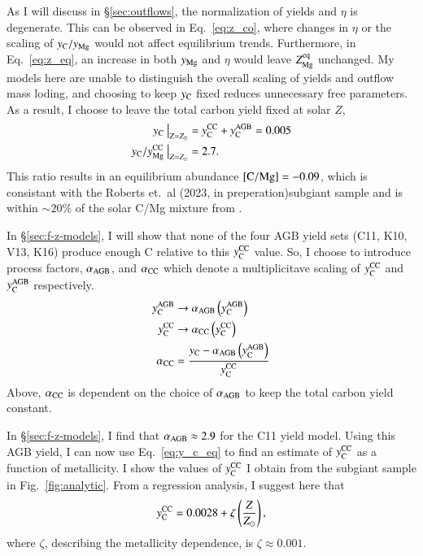 \documentclass[12pt,oneside]{report}
\newcommand{\Ycc}{\ensuremath{y_{\rm C}^{\rm CC}}}
\newcommand{\Yct}{\ensuremath{y_{\rm C}}}
\newcommand{\Yoc}{\ensuremath{y_{\rm Mg}^{\rm CC}}}
\newcommand{\Ycagb}{\ensuremath{y_{\rm C}^{\rm AGB}}}
\newcommand{\citetjack}{Roberts et.\ al (2023, in preperation)}
\begin{document}
As I will discuss in \S\ref{sec:outflows}, the normalization of yields and $\eta$ is degenerate. This can be observed in Eq.~\ref{eq:z_co}, where changes in $\eta$ or the scaling of $y_{\rm C}/y_{\rm Mg}$ would not affect equilibrium trends. Furthermore, in Eq.~\ref{eq:z_eq}, an increase in both $y_{\rm Mg}$ and $\eta$ would leave $Z_{\rm Mg}^{\rm eq}$ unchanged. My models here are unable to distinguish the overall scaling of yields and outflow mass loding, and choosing to keep $y_{\rm C}$ fixed reduces unnecessary free parameters. 
%
As a result, I choose to leave the total carbon yield fixed at solar $Z$,
\begin{subequations}
    \begin{align}
        \Yct~\big\vert_{Z=Z_\odot} &= \Ycc + \Ycagb = 0.005 \\
        \Yct/\Yoc~\big\vert_{Z=Z_\odot} &= 2.7.
    \end{align}
\end{subequations}
This ratio results in an equilibrium abundance ${\rm [C/Mg]} = -0.09$, which is consistant with the \citetjack subgiant sample and is within $\sim 20\%$ of the solar C/Mg mixture from \citet{asplund+09}.

In \S\ref{sec:f-z-models}, I will show that none of the four AGB yield sets (C11, K10, V13, K16) produce enough C relative to this $\Ycc$ value. So, I choose to introduce process factors, $\alpha_{\rm AGB}$, and $\alpha_{\rm CC}$ which denote a multiplicitave scaling of $\Ycc$ and $\Ycagb$ respectively. 
\begin{subequations} \label{eq:alpha}
    \begin{align}
        \Ycagb &\rightarrow \alpha_{\rm AGB} \left(\Ycagb\right) \\
        \Ycc &\rightarrow \alpha_{\rm CC} \left(\Ycc\right)\\
        \alpha_{\rm CC} &= \frac{\Yct - \alpha_{\rm AGB} \left(\Ycagb\right)}{\Ycc}
    \end{align}
\end{subequations}
Above, $\alpha_{\rm CC}$ is dependent on the choice of $\alpha_{\rm AGB}$ to keep the total carbon yield constant. 

In \S\ref{sec:f-z-models}, I find that $\alpha_{\rm AGB}\approx 2.9$ for the C11 yield model. Using this AGB yield, I can now use Eq.~\ref{eq:y_c_eq} to find an estimate of $\Ycc$ as a function of metallicity. I show the values of $\Ycc$ I obtain from the subgiant sample in Fig.~\ref{fig:analytic}. From a regression analysis, I suggest here that
\begin{equation}
    \Ycc = 0.0028 + \zeta\left(\frac{Z}{Z_\odot}\right),
\end{equation}
where $\zeta$, describing the metallicity dependence, is $\zeta\approx0.001$.
\end{document}
